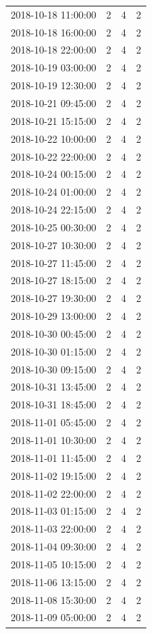 \begin{tabular}{lrrr}
2018-10-18 11:00:00 & 2 & 4 & 2 \\
2018-10-18 16:00:00 & 2 & 4 & 2 \\
2018-10-18 22:00:00 & 2 & 4 & 2 \\
2018-10-19 03:00:00 & 2 & 4 & 2 \\
2018-10-19 12:30:00 & 2 & 4 & 2 \\
2018-10-21 09:45:00 & 2 & 4 & 2 \\
2018-10-21 15:15:00 & 2 & 4 & 2 \\
2018-10-22 10:00:00 & 2 & 4 & 2 \\
2018-10-22 22:00:00 & 2 & 4 & 2 \\
2018-10-24 00:15:00 & 2 & 4 & 2 \\
2018-10-24 01:00:00 & 2 & 4 & 2 \\
2018-10-24 22:15:00 & 2 & 4 & 2 \\
2018-10-25 00:30:00 & 2 & 4 & 2 \\
2018-10-27 10:30:00 & 2 & 4 & 2 \\
2018-10-27 11:45:00 & 2 & 4 & 2 \\
2018-10-27 18:15:00 & 2 & 4 & 2 \\
2018-10-27 19:30:00 & 2 & 4 & 2 \\
2018-10-29 13:00:00 & 2 & 4 & 2 \\
2018-10-30 00:45:00 & 2 & 4 & 2 \\
2018-10-30 01:15:00 & 2 & 4 & 2 \\
2018-10-30 09:15:00 & 2 & 4 & 2 \\
2018-10-31 13:45:00 & 2 & 4 & 2 \\
2018-10-31 18:45:00 & 2 & 4 & 2 \\
2018-11-01 05:45:00 & 2 & 4 & 2 \\
2018-11-01 10:30:00 & 2 & 4 & 2 \\
2018-11-01 11:45:00 & 2 & 4 & 2 \\
2018-11-02 19:15:00 & 2 & 4 & 2 \\
2018-11-02 22:00:00 & 2 & 4 & 2 \\
2018-11-03 01:15:00 & 2 & 4 & 2 \\
2018-11-03 22:00:00 & 2 & 4 & 2 \\
2018-11-04 09:30:00 & 2 & 4 & 2 \\
2018-11-05 10:15:00 & 2 & 4 & 2 \\
2018-11-06 13:15:00 & 2 & 4 & 2 \\
2018-11-08 15:30:00 & 2 & 4 & 2 \\
2018-11-09 05:00:00 & 2 & 4 & 2 \\

\end{tabular}
